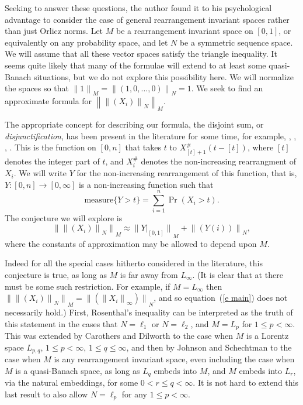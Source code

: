 \documentclass[12pt]{amsart}
\newcommand{\normo}[1]{{\left\|#1\right\|}}
\newcommand{\snormo}[1]{{\mathopen\|#1\mathclose\|}}
\newcommand{\measure}{\text{measure}}
\begin{document}
Seeking to answer these questions, the author found it to 
his psychological
advantage to consider the case of general rearrangement invariant spaces
rather than just Orlicz norms.
Let $M$ be a rearrangement invariant space on $[0,1]$, or equivalently
on any probability space, and let $N$ be a symmetric sequence space.
We will assume that all these vector spaces 
satisfy the triangle inequality.  It seems quite likely that many
of the formulae will extend to at least some quasi-Banach situations,
but we do not explore this possibility here.  We will normalize the
spaces so that $\snormo 1_M = \snormo{(1,0,\dots,0)}_N = 1$.
We seek to find an approximate formula for $\normo{\normo{(X_i)}_N}_M$.

The appropriate concept for describing our formula, the disjoint sum, 
or \emph{disjunctification}, has been
present in the literature for some time, for example, 
\cite{carothers-dilworth},
\cite{hitczenko-montgomery-smith},
\cite{johnson et al},
\cite{johnson-schechtman}. 
This is the function on $[0,n]$
that takes $t$ to $X^\#_{[t]+1}(t-[t])$, 
where $[t]$ denotes the integer part of $t$, and $X^\#_i$ 
denotes the non-increasing
rearrangment of $X_i$.  We will write $Y$ for the
non-increasing rearrangement of this function, that is, 
$Y:[0,n] \to [0,\infty]$ is a non-increasing
function such that
\[ \measure\{Y > t \} = \sum_{i=1}^n \Pr(X_i > t) . \]
The conjecture we will explore is
\begin{equation}
\label{e main}
   \snormo{\snormo{(X_i)}_N}_M \approx
   \snormo{Y|_{[0,1]}}_M + \snormo{(Y(i))}_N ,
\end{equation}
where the constants of approximation may be allowed to depend upon $M$.

Indeed for all the special cases hitherto considered in the literature,
this conjecture is true,
as long as $M$ is far away from $L_\infty$.
(It is clear that at there must be some such restriction.  For example,  
if $M = L_\infty$ then $\snormo{\snormo{(X_i)}_N}_M = 
\snormo{(\snormo{X_i}_\infty)}_N$, and so equation~(\ref{e main})
does not necessarily hold.)
First, Rosenthal's
inequality \cite{rosenthal} can be interpreted
as the truth of this statement in the cases that 
$N = \ell_1$ or $N = \ell_2$,
and $M = L_p$ for $1 \le p < \infty$.  This was extended by
Carothers and Dilworth \cite{carothers-dilworth} to the case when
$M$ is a Lorentz space $L_{p,q}$, $1 \le p < \infty$, $1 \le q \le \infty$,
and then by Johnson and Schechtman \cite{johnson-schechtman} to the case
when $M$ is any rearrangement invariant space, even including the case
when $M$ is a quasi-Banach space, as long as $L_q$ embeds into $M$, and $M$ 
embeds into $L_r$, via the natural embeddings, for some $0<r\le q < \infty$.
It is not hard to extend this last result to also allow $N = \ell_p$ for any
$1 \le p < \infty$.
\end{document}
